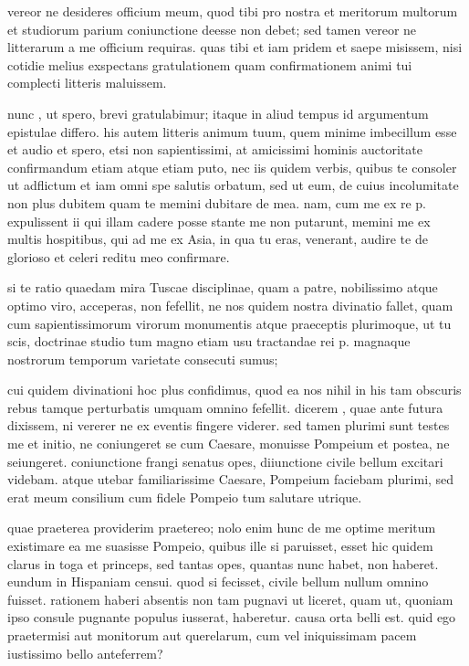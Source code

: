 


 vereor ne desideres officium meum, quod tibi pro nostra et meritorum multorum et studiorum parium coniunctione deesse non debet; sed tamen vereor ne litterarum a me officium requiras. quas tibi et iam pridem et saepe misissem, nisi cotidie melius exspectans gratulationem quam confirmationem animi tui complecti litteris maluissem.

 nunc , ut spero, brevi gratulabimur; itaque in aliud tempus id argumentum epistulae differo. his autem litteris animum tuum, quem minime imbecillum esse et audio et spero, etsi non sapientissimi, at amicissimi hominis auctoritate confirmandum etiam atque etiam puto, nec iis quidem verbis, quibus te consoler ut adflictum et iam omni spe salutis orbatum, sed ut eum, de cuius incolumitate non plus dubitem quam te memini dubitare de mea. nam, cum me ex re p. expulissent ii qui illam cadere posse stante me non putarunt, memini me ex multis hospitibus, qui ad me ex Asia, in qua tu eras, venerant, audire te de glorioso et celeri reditu meo confirmare.

 si te ratio quaedam mira Tuscae disciplinae, quam a patre, nobilissimo atque optimo viro, acceperas, non fefellit, ne nos quidem nostra divinatio fallet, quam cum sapientissimorum virorum monumentis atque praeceptis plurimoque, ut tu scis, doctrinae studio tum magno etiam usu tractandae rei p. magnaque nostrorum temporum varietate consecuti sumus;

 cui quidem divinationi hoc plus confidimus, quod ea nos nihil in his tam obscuris rebus tamque perturbatis umquam omnino fefellit. dicerem , quae ante futura dixissem, ni vererer ne ex eventis fingere viderer. sed tamen plurimi sunt testes me et initio, ne coniungeret se cum Caesare, monuisse Pompeium et postea, ne seiungeret. coniunctione frangi senatus opes, diiunctione civile bellum excitari videbam. atque utebar familiarissime Caesare, Pompeium faciebam plurimi, sed erat meum consilium cum fidele Pompeio tum salutare utrique.

 quae praeterea providerim praetereo; nolo enim hunc de me optime meritum existimare ea me suasisse Pompeio, quibus ille si paruisset, esset hic quidem clarus in toga et princeps, sed tantas opes, quantas nunc habet, non haberet. eundum in Hispaniam censui. quod si fecisset, civile bellum nullum omnino fuisset. rationem haberi absentis non tam pugnavi ut liceret, quam ut, quoniam ipso consule pugnante populus iusserat, haberetur. causa orta belli est. quid ego praetermisi aut monitorum aut querelarum, cum vel iniquissimam pacem iustissimo bello anteferrem?

